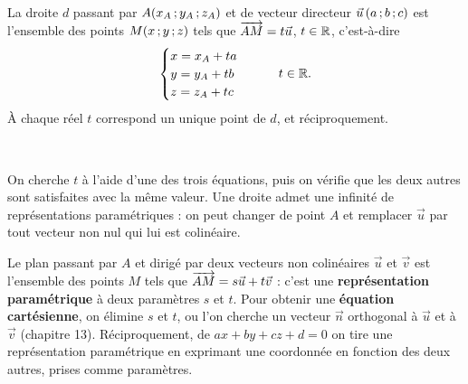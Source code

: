 \noindent
\begin{minipage}[c]{0.58\linewidth}
\begin{theoreme}
\raggedright
La droite $d$ passant par $A(x_A\,{;}\, y_A\,{;}\, z_A)$ et de vecteur directeur $\vec u\,(a\,{;}\, b\,{;}\, c)$ est l'ensemble des points
$M(x\,{;}\, y\,{;}\, z)$ tels que $\overrightarrow{AM}=t\vec u$, $t\in\mathbb{R}$, c'est-à-dire
\[\begin{cases}x=x_A+ta\\ y=y_A+tb\\ z=z_A+tc\end{cases}\qquad t\in\mathbb{R}.\]
À chaque réel $t$ correspond un unique point de $d$, et réciproquement.
\end{theoreme}
\end{minipage}\hfill
\begin{minipage}[c]{0.38\linewidth}
\centering
{}\\[0.5mm]
\end{minipage}

\begin{savoirfaire}
On cherche $t$ à l'aide d'une des trois équations, puis on vérifie que les deux autres sont satisfaites avec la même valeur. Une droite
admet une infinité de représentations paramétriques : on peut changer de point $A$ et remplacer $\vec u$ par tout vecteur non nul qui
lui est colinéaire.
\end{savoirfaire}


\begin{propriete}
Le plan passant par $A$ et dirigé par deux vecteurs non colinéaires $\vec u$ et $\vec v$ est l'ensemble des points $M$ tels que
$\overrightarrow{AM}=s\vec u+t\vec v$ : c'est une \textbf{représentation paramétrique} à deux paramètres $s$ et $t$. Pour obtenir une
\textbf{équation cartésienne}, on élimine $s$ et $t$, ou l'on cherche un vecteur $\vec n$ orthogonal à $\vec u$ et à $\vec v$
(chapitre 13). Réciproquement, de $ax+by+cz+d=0$ on tire une représentation paramétrique en exprimant une coordonnée en fonction des
deux autres, prises comme paramètres.
\end{propriete}

